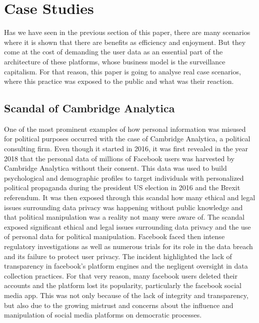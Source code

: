 \section{Case Studies}\label{sec:case-studies}

Has we have seen in the previous section of this paper, there are many scenarios where it is shown that there are benefits as efficiency and enjoyment.
But they come at the cost of demanding the user data as an essential part of the architecture of these platforms, whose business model is the surveillance capitalism.
For that reason, this paper is going to analyse real case scenarios, where this practice was exposed to the public and what was their reaction.

\subsection{Scandal of Cambridge Analytica}\label{subsec:scandal-of-cambridge-analytica}
One of the most prominent examples of how personal information was misused for political purposes occurred with the case of Cambridge Analytica, a political consulting firm.
Even though it started in 2016, it was first revealed in the year 2018 that the personal data of millions of Facebook users was harvested by Cambridge Analytica\cite{Cadwalladr2018_CambridgeAnalytica} without their consent.
This data was used to build psychological and demographic profiles to target individuals with personalized political propaganda during the president US election in 2016\cite{Rosenberg2018_ExploitedData} and the Brexit referendum.
It was then exposed through this scandal how many ethical and legal issues surrounding data privacy was happening without public knowledge and that political manipulation was a reality not many were aware of.
The scandal exposed significant ethical and legal issues surrounding data privacy and the use of personal data for political manipulation.
Facebook faced then intense regulatory investigations as well as numerous trials for its role in the data breach and its failure to protect user privacy.
The incident highlighted the lack of transparency in facebook's platform engines and the negligent oversight in data collection practices.
For that very reason, many facebook users deleted their accounts and the platform lost its popularity, particularly the facebook social media app.
This was not only because of the lack of integrity and transparency, but also due to the growing mistrust and concerns about the influence and manipulation of social media platforms on democratic processes.
